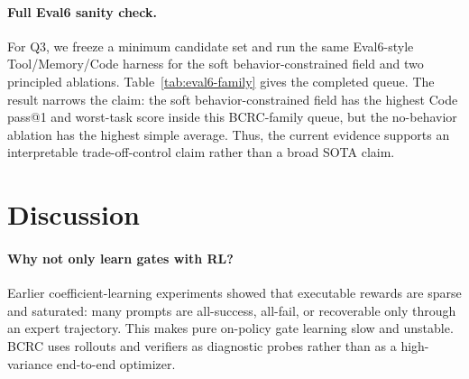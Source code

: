 \documentclass{article}
\newcommand{\bcrc}{\textsc{BCRC}\xspace}
\begin{document}
\paragraph{Full Eval6 sanity check.}
For Q3, we freeze a minimum candidate set and run the same Eval6-style Tool/Memory/Code harness for the soft behavior-constrained field and two principled ablations.  Table~\ref{tab:eval6-family} gives the completed queue.  The result narrows the claim: the soft behavior-constrained field has the highest Code pass@1 and worst-task score inside this BCRC-family queue, but the no-behavior ablation has the highest simple average.  Thus, the current evidence supports an interpretable trade-off-control claim rather than a broad SOTA claim.

\begin{table}[t]
\centering
\scriptsize
{}
\caption{Completed selected Eval6 queue.  Soft behavior constraints improve Code pass@1 and the worst-task score within the selected BCRC-family rows, while the no-behavior ablation has the highest simple average.  This supports a mechanism and trade-off-control claim, not a broad SOTA claim.}
\label{tab:eval6-family}
\end{table}

\section{Discussion}

\paragraph{Why not only learn gates with RL?}
Earlier coefficient-learning experiments showed that executable rewards are sparse and saturated: many prompts are all-success, all-fail, or recoverable only through an expert trajectory.  This makes pure on-policy gate learning slow and unstable.  \bcrc uses rollouts and verifiers as diagnostic probes rather than as a high-variance end-to-end optimizer.
\end{document}
